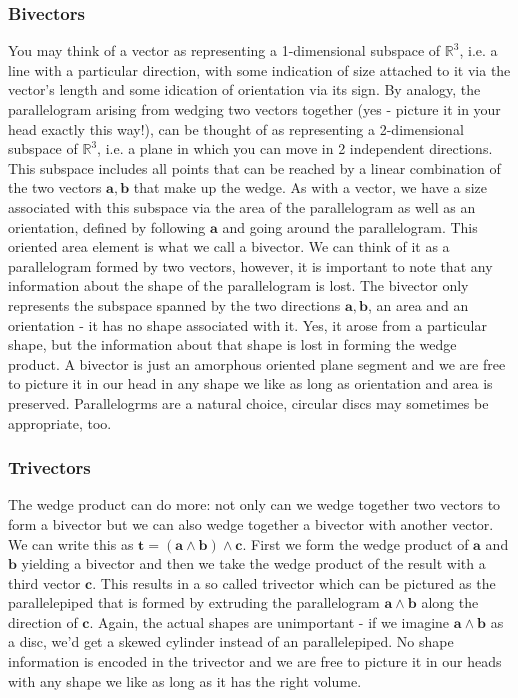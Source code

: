 \subsubsection{Bivectors}
You may think of a vector as representing a 1-dimensional subspace of $\mathbb{R}^3$, i.e. a line with a particular direction, with some indication of size attached to it via the vector's length and some idication of orientation via its sign. By analogy, the parallelogram arising from wedging two vectors together (yes - picture it in your head exactly this way!), can be thought of as representing a 2-dimensional subspace of $\mathbb{R}^3$, i.e. a plane in which you can move in 2 independent directions. This subspace includes all points that can be reached by a linear combination of the two vectors $\mathbf{a,b}$ that make up the wedge. As with a vector, we have a size associated with this subspace via the area of the parallelogram as well as an orientation, defined by following $\mathbf{a}$ and going around the parallelogram. This oriented area element is what we call a bivector. We can think of it as a parallelogram formed by two vectors, however, it is important to note that any information about the shape of the parallelogram is lost. The bivector only represents the subspace spanned by the two directions $\mathbf{a,b}$, an area and an orientation - it has no shape associated with it. Yes, it arose from a particular shape, but the information about that shape is lost in forming the wedge product. A bivector is just an amorphous oriented plane segment and we are free to picture it in our head in any shape we like as long as orientation and area is preserved. Parallelogrms are a natural choice, circular discs may sometimes be appropriate, too.

\subsubsection{Trivectors}
The wedge product can do more: not only can we wedge together two vectors to form a bivector but we can also wedge together a bivector with another vector. We can write this as $\mathbf{t = (a \wedge b) \wedge c}$. First we form the wedge product of $\mathbf{a}$ and  $\mathbf{b}$ yielding a bivector and then we take the wedge product of the result with a third vector $\mathbf{c}$. This results in a so called trivector which can be pictured as the parallelepiped that is formed by extruding the parallelogram $\mathbf{a \wedge b}$ along the direction of $\mathbf{c}$. Again, the actual shapes are unimportant - if we imagine $\mathbf{a \wedge b}$ as a disc, we'd get a skewed cylinder instead of an parallelepiped. No shape information is encoded in the trivector and we are free to picture it in our heads with any shape we like as long as it has the right volume.

